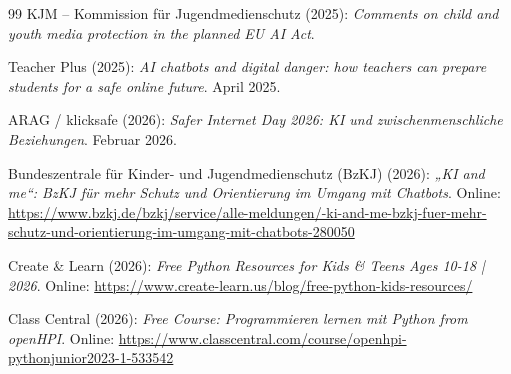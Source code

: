 \documentclass[12pt,a4paper,oneside]{scrartcl}
\begin{document}
\begin{thebibliography}{99}
		KJM – Kommission für Jugendmedienschutz (2025): \emph{Comments on child and youth media protection in the planned EU AI Act}.
		
		Teacher Plus (2025): \emph{AI chatbots and digital danger: how teachers can prepare students for a safe online future}. April 2025.
		
		ARAG / klicksafe (2026): \emph{Safer Internet Day 2026: KI und zwischenmenschliche Beziehungen}. Februar 2026.
		
		Bundeszentrale für Kinder- und Jugendmedienschutz (BzKJ) (2026): \emph{„KI and me“: BzKJ für mehr Schutz und Orientierung im Umgang mit Chatbots}. Online: \url{https://www.bzkj.de/bzkj/service/alle-meldungen/-ki-and-me-bzkj-fuer-mehr-schutz-und-orientierung-im-umgang-mit-chatbots-280050}
		
		Create \& Learn (2026): \emph{Free Python Resources for Kids \& Teens Ages 10-18 | 2026}. Online: \url{https://www.create-learn.us/blog/free-python-kids-resources/}
		
		Class Central (2026): \emph{Free Course: Programmieren lernen mit Python from openHPI}. Online: \url{https://www.classcentral.com/course/openhpi-pythonjunior2023-1-533542}
		
	\end{thebibliography}
	
\end{document}
